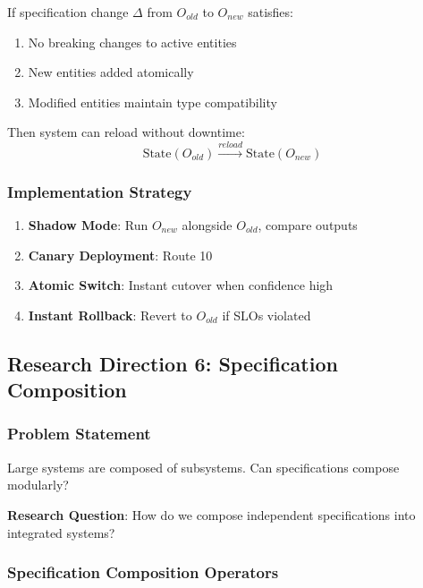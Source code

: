 \begin{theorem}
    If specification change $\Delta$ from $O_{old}$ to $O_{new}$ satisfies:
    \begin{enumerate}
        \item No breaking changes to active entities
        \item New entities added atomically
        \item Modified entities maintain type compatibility
    \end{enumerate}
    Then system can reload without downtime:
    \begin{equation}
        \text{State}(O_{old}) \xrightarrow{reload} \text{State}(O_{new})
    \end{equation}
\end{theorem}

\subsubsection{Implementation Strategy}

\begin{enumerate}
    \item \textbf{Shadow Mode}: Run $O_{new}$ alongside $O_{old}$, compare outputs
    \item \textbf{Canary Deployment}: Route 10%
    \item \textbf{Atomic Switch}: Instant cutover when confidence high
    \item \textbf{Instant Rollback}: Revert to $O_{old}$ if SLOs violated
\end{enumerate}

\subsection{Research Direction 6: Specification Composition}

\subsubsection{Problem Statement}

Large systems are composed of subsystems. Can specifications compose modularly?

\textbf{Research Question}: How do we compose independent specifications into integrated systems?

\subsubsection{Specification Composition Operators}

